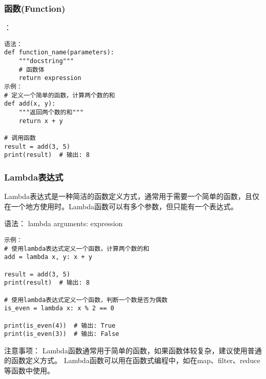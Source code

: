 \documentclass{article}
\begin{document}
\subsubsection{ 函数(Function)}：
\begin{lstlisting}[caption={示例Python代码}]
语法：
def function_name(parameters):
    """docstring"""
    # 函数体
    return expression
示例：
# 定义一个简单的函数，计算两个数的和
def add(x, y):
    """返回两个数的和"""
    return x + y

# 调用函数
result = add(3, 5)
print(result)  # 输出: 8
\end{lstlisting}
\subsubsection{Lambda表达式}
Lambda表达式是一种简洁的函数定义方式，通常用于需要一个简单的函数，且仅在一个地方使用时。Lambda函数可以有多个参数，但只能有一个表达式。

语法：
lambda arguments: expression
\begin{lstlisting}[caption={示例Python代码}]
示例：
# 使用lambda表达式定义一个函数，计算两个数的和
add = lambda x, y: x + y

result = add(3, 5)
print(result)  # 输出: 8

# 使用lambda表达式定义一个函数，判断一个数是否为偶数
is_even = lambda x: x % 2 == 0

print(is_even(4))  # 输出: True
print(is_even(3))  # 输出: False
\end{lstlisting}
注意事项：
Lambda函数通常用于简单的函数，如果函数体较复杂，建议使用普通的函数定义方式。
Lambda函数可以用在函数式编程中，如在map、filter、reduce等函数中使用。
\end{document}

